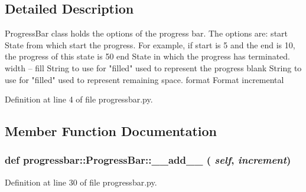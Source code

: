 \subsection{Detailed Description}
\begin{DoxyVerb}ProgressBar class holds the options of the progress bar.
The options are:
    start   State from which start the progress. For example, if start is
            5 and the end is 10, the progress of this state is 50%
    end     State in which the progress has terminated.
    width   --
    fill    String to use for "filled" used to represent the progress
    blank   String to use for "filled" used to represent remaining space.
    format  Format
    incremental
\end{DoxyVerb}
 

Definition at line 4 of file progressbar.py.

\subsection{Member Function Documentation}
\hypertarget{classprogressbar_1_1ProgressBar_a1f77ba8c29d99201812d6072c196c442}{
\subsubsection[{\_\-\_\-add\_\-\_\-}]{\setlength{\rightskip}{0pt plus 5cm}def progressbar::ProgressBar::\_\-\_\-add\_\-\_\- ( {\em self}, \/   {\em increment})}}
\label{classprogressbar_1_1ProgressBar_a1f77ba8c29d99201812d6072c196c442}


Definition at line 30 of file progressbar.py.


